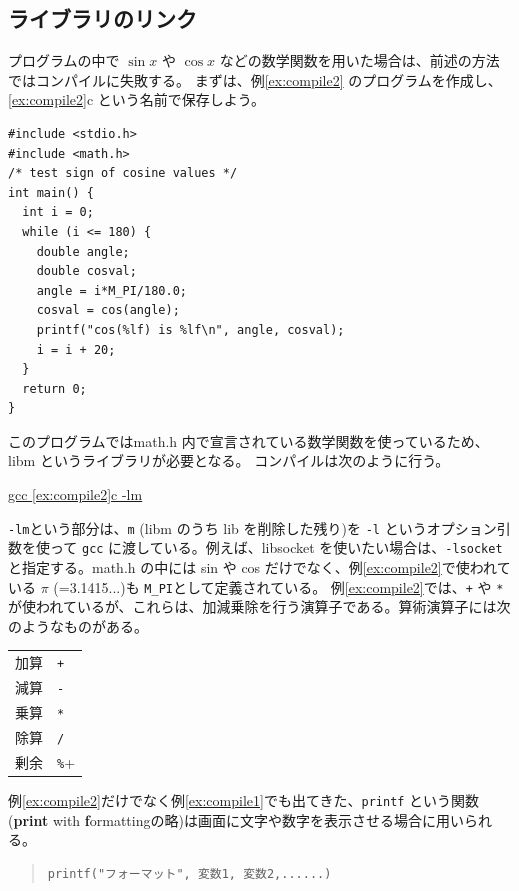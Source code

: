 \subsection{ライブラリのリンク}
プログラムの中で $\sin x$ や $\cos x$ などの数学関数を用いた場合は、前述の方法ではコンパイルに失敗する。
まずは、例\ref{ex:compile2} のプログラムを作成し、\ref{ex:compile2}c という名前で保存しよう。
\begin{reidai}\label{ex:compile2}
\begin{verbatim}
#include <stdio.h>
#include <math.h>
/* test sign of cosine values */
int main() {
  int i = 0;
  while (i <= 180) {
    double angle;
    double cosval;
    angle = i*M_PI/180.0;
    cosval = cos(angle);
    printf("cos(%lf) is %lf\n", angle, cosval);
    i = i + 20;
  }
  return 0;
}
\end{verbatim}
\end{reidai} \noindent
このプログラムではmath.h 内で宣言されている数学関数を使っているため、libm というライブラリが必要となる。
コンパイルは次のように行う。
\begin{commandline2}
\prompt \underline{gcc \ref{ex:compile2}c -lm}
\end{commandline2} \noindent
\verb+-lm+という部分は、\verb+m+ (libm のうち lib を削除した残り)を \verb+-l+ というオプション引数を使って \verb+gcc+ に渡している。例えば、libsocket を使いたい場合は、\verb+-lsocket+ と指定する。math.h の中には sin や cos だけでなく、例\ref{ex:compile2}で使われている $\pi$ (=3.1415...)も \verb+M_PI+として定義されている。
%
例\ref{ex:compile2}では、\verb|+| や \verb+*+ が使われているが、これらは、加減乗除を行う演算子である。算術演算子には次のようなものがある。
\begin{table}[H]
\begin{center}
\begin{tabular}{ll}
  加算 & \verb|+| \\
  減算 & \verb+-+ \\
  乗算 & \verb+*+ \\
  除算 & \verb+/+ \\
  剰余 & \verb+%+
\end{tabular}
\end{center}
\end{table} \noindent
例\ref{ex:compile2}だけでなく例\ref{ex:compile1}でも出てきた、\verb+printf+ という関数(\textbf{print} with \textbf{f}ormattingの略)は画面に文字や数字を表示させる場合に用いられる。
\begin{quote}
\begin{verbatim}
printf("フォーマット", 変数1, 変数2,......)
\end{verbatim}
\end{quote}
